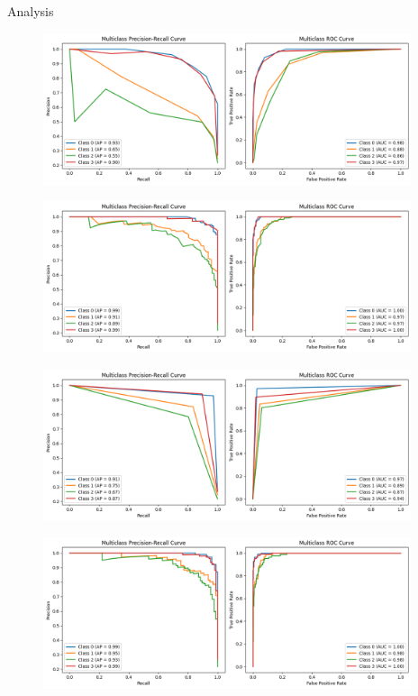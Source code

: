 \documentclass[14pt, aspectratio=169]{beamer}
\begin{document}
\begin{frame}[allowframebreaks]{Analysis}
\begin{adjustwidth}{-0.3cm}{0cm}
\begin{figure}[H]
  \centering
  \includegraphics[height=12em]{../report/ra_pr_KNN.png}
  \label{ra_pr_KNN}
\end{figure}

\begin{figure}[H]
  \centering
  \includegraphics[height=12em]{../report/ra_pr_RF.png}
  \label{ra_pr_RF}
\end{figure}

\begin{figure}[H]
  \centering
  \includegraphics[height=12em]{../report/ra_pr_DT.png}
  \label{ra_pr_DT}
\end{figure}

\begin{figure}[H]
  \centering
  \includegraphics[height=12em]{../report/ra_pr_SVM.png}
  \label{ra_pr_SVM}
\end{figure}


\end{adjustwidth}
\end{frame}
\end{document}
